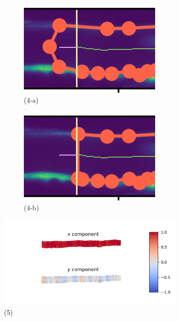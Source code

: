 \documentclass{article}
\begin{document}
\begin{figure}
    \begin{subfigure}{0.8 \linewidth}
    \centering
    \begin{subfigure}{0.3 \linewidth}
    \centering
    \includegraphics[width=\linewidth]{figures/clipping_full_poly.png}
    (4-a)
    \end{subfigure}
    \begin{subfigure}{0.3 \linewidth}
    \centering
    \includegraphics[width=\linewidth]{figures/clipping_clipped_poly.png}
    (4-b)
    \end{subfigure}
    \end{subfigure}
    \begin{subfigure}{0.8 \linewidth}
    \centering
    \includegraphics[width=\linewidth]{figures/centerline_direction.png} \\
    (5)
    \end{subfigure}
    

\end{figure}
\end{document}
